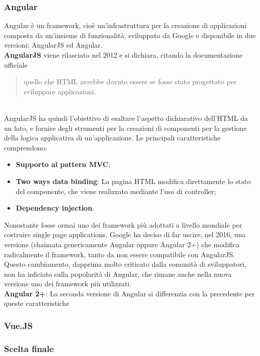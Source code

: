 \subsubsection{Angular}
Angular è un framework, cioè un'infrastruttura per la creazione di applicazioni composta da un'insieme di funzionalità, sviluppato da Google e disponibile in due versioni: AngularJS ed Angular.\\
\textbf{AngularJS} viene rilasciato nel 2012 e si dichiara, citando la documentazione ufficiale 
\begin{quote}
quello che HTML avrebbe dovuto essere se fosse stato progettato per sviluppare applicazioni.
\end{quote} \\
AngularJS ha quindi l'obiettivo di esaltare l'aspetto dichiarativo dell'HTML da un lato, e fornire degli strumenti per la creazioni di componenti per la gestione della logica applicativa di un'applicazione.
Le principali caratteristiche comprendono:
\begin{itemize}
	\item \textbf{Supporto al pattern MVC};
	\item \textbf{Two ways data binding}: La pagina HTML modifica direttamente lo stato del componente, che viene realizzato mediante l'uso di controller;
	\item \textbf{Dependency injection}. %
\end{itemize}
Nonostante fosse ormai uno dei framework più adottati a livello mondiale per costruire \gls{single page applications}, Google ha deciso di far uscire, nel 2016, una versione (chaimata genericamente Angular oppure Angular 2+) che modifica radicalmente il framework, tanto da non essere compatibile con AngularJS.\\
Questo cambiamento, dapprima molto criticato dalla comunità di sviluppatori, non ha inficiato sulla popolarità di Angular, che rimane anche nella nuova versione uno dei framework più utilizzati.\\
\textbf{Angular 2+}: La seconda versione di Angular si differenzia con la precedente per queste caratteristiche
\subsubsection{Vue.JS}
\subsubsection{Scelta finale}